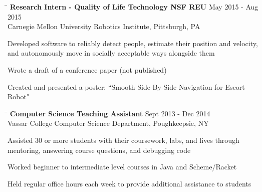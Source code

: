 \documentclass{res}
\begin{document}
\begin{resume}
{    \vspace{-12pt}
    \begin{tabbing}
      \hspace{5.65in}\=  \kill %
      {\bf Research Intern - Quality of Life Technology NSF REU}
      \>May 2015 - Aug 2015\\
      Carnegie Mellon University Robotics Institute, Pittsburgh, PA\\     
    \end{tabbing}
    \vspace{-24pt}      %
    \begin{list}{\bf{-}}{}
      \setlength{\itemsep}{-2pt}
      \item Developed software to reliably detect people, estimate their position and velocity,\\ and autonomously move in socially
            acceptable ways alongside them
      \item Wrote a draft of a conference paper (not published)
      \item Created and presented a poster: ``Smooth Side By Side Navigation for
            Escort Robot"
    \end{list}

    \vspace{-12pt}
    \begin{tabbing}
      \hspace{5.65in}\=  \kill %
      {\bf Computer Science Teaching Assistant}
      \>Sept 2013 - Dec 2014\\
      Vassar College Computer Science Department, Poughkeepsie, NY\\     
    \end{tabbing}
    \vspace{-24pt}      %
    \begin{list}{\bf{-}}{}
      \setlength{\itemsep}{-2pt}
      \item Assisted 30 or more students with their coursework, labs, and lives
            through\\ mentoring, answering course questions, and debugging code
      \item Worked beginner to intermediate level courses in Java and
            Scheme/Racket
      \item Held regular office hours each week to provide additional assistance
            to students
    \end{list}

}
\end{resume}
\end{document}
